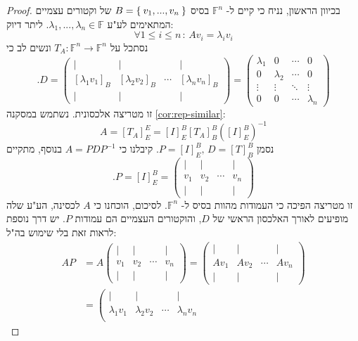 \documentclass[12pt]{report}
\theoremstyle{plain}
\theoremstyle{definition}
\newcommand{\F}{\mathbb{F}}
\newcommand{\0}{\mathbf{0}}
\begin{document}
\begin{proof}
בכיוון הראשון, נניח כי קיים ל-
$\F^n$
בסיס
$B=\Set{v_1,...,v_n}$
של וקטורים עצמיים המתאימים לע"ע 
$\lambda_1,...,\lambda_n\in\F$.
ליתר דיוק:
$$
\forall 1\leq i\leq n\,:\,Av_i=\lambda_iv_i
$$
נסתכל על 
$T_A:\F^n\to\F^n$
ונשים לב כי
$$
.D=\begin{pmatrix}
\big| & \big| &        & \big| \\
[\lambda_1 v_1]_B & [\lambda_2 v_2]_B & \cdots & [\lambda_n v_n]_B \\
\big| & \big| &        & \big|
\end{pmatrix}
=
\begin{pmatrix}
\lambda_1 & 0 & \cdots & 0 \\
0 & \lambda_2 & \cdots & 0 \\
\vdots & \vdots & \ddots & \vdots \\
0 & 0 & \cdots & \lambda_n
\end{pmatrix}
$$
זו מטריצה אלכסונית. נשתמש במסקנה
\ref{cor:rep-similar}:
$$
A=[T_A]_E^E=[I]_E^B[T_A]_B^B([I]_E^B)^{-1}
$$
נסמן 
$P=[I]_E^B,\,D=[T]_B^B$.
קיבלנו כי
$A=PDP^{-1}$
בנוסף, מתקיים
$$
.P=[I]_E^B=
\left(
\begin{array}{cccc}
\big| & \big| &        & \big| \\
v_1 & v_2 & \cdots & v_n \\
\big| & \big| &        & \big|
\end{array}
\right)
$$
זו מטריצה הפיכה כי העמודות מהוות בסיס ל-
$\F^n$.
לסיכום, הוכחנו כי
$A$
לכסינה, הע"ע שלה מופיעים לאורך האלכסון הראשי של 
$D$,
והוקטורים העצמיים הם עמודות 
$P$.
יש דרך נוספת לראות זאת בלי שימוש בה"ל:
$$
\begin{aligned}
AP&=A\left(
\begin{array}{cccc}
\big| & \big| &        & \big| \\
v_1 & v_2 & \cdots & v_n \\
\big| & \big| &        & \big|
\end{array}
\right)=\left(
\begin{array}{cccc}
\big| & \big| &        & \big| \\
Av_1 & Av_2 & \cdots & Av_n \\
\big| & \big| &        & \big|
\end{array}
\right)\\
&=\left(
\begin{array}{cccc}
\big| & \big| &        & \big| \\
\lambda_1v_1 & \lambda_2v_2 & \cdots & \lambda_nv_n \\

\end{array}
\end{aligned}$$
\end{proof}
\end{document}
